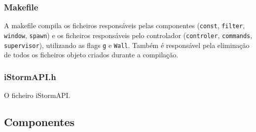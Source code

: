 \documentclass[12pt]{article}
\begin{document}
\subsubsection{Makefile}
A makefile compila os ficheiros responsáveis pelas componentes (\texttt{const},  \texttt{filter}, \texttt{window}, \texttt{spawn}) e os ficheiros responsáveis pelo controlador (\texttt{controler}, \texttt{commands}, \texttt{supervisor}), utilizando as flags \texttt{g} e \texttt{Wall}. Também é responsável pela eliminação de todos os ficheiros objeto criados durante a compilação.

\subsubsection{iStormAPI.h}
O ficheiro iStormAPI.


\subsection{Componentes} 
\end{document}
